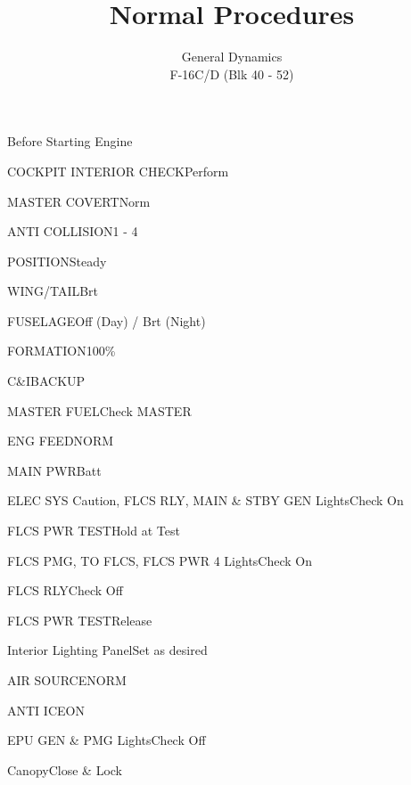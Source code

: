 \documentclass[sim-use]{checklist}
\title{Normal Procedures}
\subtitle{General Dynamics \\ F-16C/D (Blk 40 - 52)}
\begin{document}
\begin{checklist}{Before Starting Engine}
	\item{COCKPIT INTERIOR CHECK}{Perform}
	 {
		\item{MASTER COVERT}{Norm}
		\item{ANTI COLLISION}{1 - 4}
		\item{POSITION}{Steady}
		\item{WING/TAIL}{Brt}
		\item{FUSELAGE}{Off (Day) / Brt (Night)}
		\item{FORMATION}{100\%}
	}
	\item{C\&I}{BACKUP}
	\item{MASTER FUEL}{Check MASTER}
	\item{ENG FEED}{NORM}
	 {
		\item{MAIN PWR}{Batt}
		\item{ELEC SYS Caution, FLCS RLY, MAIN \& STBY GEN Lights}{Check On}
		\item{FLCS PWR TEST}{Hold at Test}
		\item{FLCS PMG, TO FLCS, FLCS PWR 4 Lights}{Check On}
		\item{FLCS RLY}{Check Off}
		\item{FLCS PWR TEST}{Release}
	}
	\item{Interior Lighting Panel}{Set as desired}
	\item{AIR SOURCE}{NORM}
	\item{ANTI ICE}{ON}
	\item{EPU GEN \& PMG Lights}{Check Off}
	\item{Canopy}{Close \& Lock}
\end{checklist}
\end{document}
